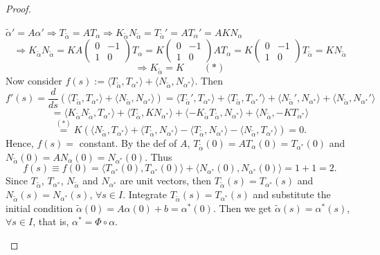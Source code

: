 \begin{proof}
\begin{enumerate}
\noindent $\tilde{\alpha}' = A\alpha' \Rightarrow T_{\tilde{\alpha}} = AT_\alpha \Rightarrow K_{\tilde{\alpha}}N_{\tilde{\alpha}} = T_{\tilde{\alpha}}' = AT_\alpha' = AK N_\alpha$
\[
\Rightarrow K_{\tilde{\alpha}}N_{\tilde{\alpha}} = KA\begin{pmatrix}0 & -1\\1 & 0\end{pmatrix}T_\alpha = K\begin{pmatrix}0 & -1\\1 & 0\end{pmatrix}AT_\alpha = K\begin{pmatrix}0 & -1\\1 & 0\end{pmatrix}T_{\tilde{\alpha}} = KN_{\tilde{\alpha}}
\]
\[
\Rightarrow K_{\tilde{\alpha}} = K \quad\quad (*)
\]
Now consider $f(s) := \langle T_{\tilde{\alpha}}, T_{\alpha^*}\rangle + \langle N_{\tilde{\alpha}}, N_{\alpha^*}\rangle$. Then
\[
f'(s) = \frac{d}{ds}\left(\langle T_{\tilde{\alpha}}, T_{\alpha^*}\rangle + \langle N_{\tilde{\alpha}}, N_{\alpha^*}\rangle\right) = \langle T_{\tilde{\alpha}}', T_{\alpha^*}\rangle + \langle T_{\tilde{\alpha}}, T_{\alpha^*}'\rangle + \langle N_{\tilde{\alpha}}', N_{\alpha^*}\rangle + \langle N_{\tilde{\alpha}}, N_{\alpha^*}'\rangle
\]
\[
= \langle K_{\tilde{\alpha}}N_{\tilde{\alpha}}, T_{\alpha^*}\rangle + \langle T_{\tilde{\alpha}}, KN_{\alpha^*}\rangle + \langle -K_{\tilde{\alpha}}T_{\tilde{\alpha}}, N_{\alpha^*}\rangle + \langle N_{\tilde{\alpha}}, -KT_{\alpha^*}\rangle
\]
\[
\stackrel{(*)}{=} K\left(\langle N_{\tilde{\alpha}}, T_{\alpha^*}\rangle + \langle T_{\tilde{\alpha}}, N_{\alpha^*}\rangle - \langle T_{\tilde{\alpha}}, N_{\alpha^*}\rangle - \langle N_{\tilde{\alpha}}, T_{\alpha^*}\rangle\right) = 0.
\]
Hence, $f(s) = $ constant. By the def of $A$, $T_{\tilde{\alpha}}(0) = AT_\alpha(0) = T_{\alpha^*}(0)$ and $N_{\tilde{\alpha}}(0) = AN_\alpha(0) = N_{\alpha^*}(0)$. Thus
\[
f(s)\equiv f(0) = \langle T_{\alpha^*}(0), T_{\alpha^*}(0)\rangle + \langle N_{\alpha^*}(0), N_{\alpha^*}(0)\rangle = 1+1 = 2.
\]
Since $T_{\tilde{\alpha}}$, $T_{\alpha^*}$, $N_{\tilde{\alpha}}$ and $N_{\alpha^*}$ are unit vectors, then $T_{\tilde{\alpha}}(s) = T_{\alpha^*}(s)$ and $N_{\tilde{\alpha}}(s) = N_{\alpha^*}(s)$, $\forall s\in I$. Integrate $T_{\tilde{\alpha}}(s) = T_{\alpha^*}(s)$ and substitute the initial condition $\tilde{\alpha}(0) = A\alpha(0) + b = \alpha^*(0)$. Then we get $\tilde{\alpha}(s) = \alpha^*(s)$, $\forall s\in I$, that is, $\alpha^* = \Phi\circ\alpha$.
\end{enumerate}
\end{proof}


